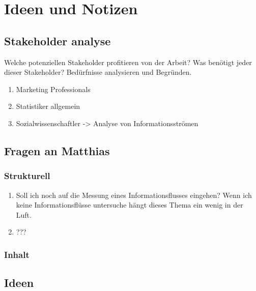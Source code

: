 \chapter{Ideen und Notizen}

	\section{Stakeholder analyse}
	Welche potenziellen Stakeholder profitieren von der Arbeit? 
	Was benötigt jeder dieser Stakeholder? Bedürfnisse analysieren und Begründen.  

	\begin{enumerate}
		\item Marketing Professionals
		\item Statistiker allgemein
		\item Sozialwissenschaftler -> Analyse von Informationsströmen
	\end{enumerate}


	\section{Fragen an Matthias}
		\subsection{Strukturell}
			\begin{enumerate}
				\item Soll ich noch auf die Messung eines Informationsflusses eingehen? 
				Wenn ich keine Informationsflüsse untersuche hängt dieses Thema ein wenig in der Luft.
				\item ???  
			\end{enumerate}

		\subsection{Inhalt} 


	\section{Ideen}


